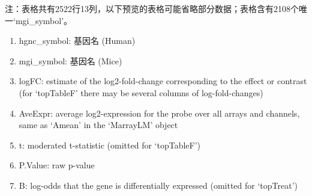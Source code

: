 \documentclass[
]{article}
\providecommand{\tightlist}{%
  \setlength{\itemsep}{0pt}\setlength{\parskip}{0pt}}
\begin{document}
\begin{center}\begin{tcolorbox}[colback=gray!10, colframe=gray!50, width=0.9\linewidth, arc=1mm, boxrule=0.5pt]注：表格共有2522行13列，以下预览的表格可能省略部分数据；表格含有2108个唯一`mgi\_symbol'。
\end{tcolorbox}
\end{center}
\begin{center}\begin{tcolorbox}[colback=gray!10, colframe=gray!50, width=0.9\linewidth, arc=1mm, boxrule=0.5pt]\begin{enumerate}\tightlist
\item hgnc\_symbol:  基因名 (Human)
\item mgi\_symbol:  基因名 (Mice)
\item logFC:  estimate of the log2-fold-change corresponding to the effect or contrast (for ‘topTableF’ there may be several columns of log-fold-changes)
\item AveExpr:  average log2-expression for the probe over all arrays and channels, same as ‘Amean’ in the ‘MarrayLM’ object
\item t:  moderated t-statistic (omitted for ‘topTableF’)
\item P.Value:  raw p-value
\item B:  log-odds that the gene is differentially expressed (omitted for ‘topTreat’)
\end{enumerate}\end{tcolorbox}
\end{center}
\end{document}
